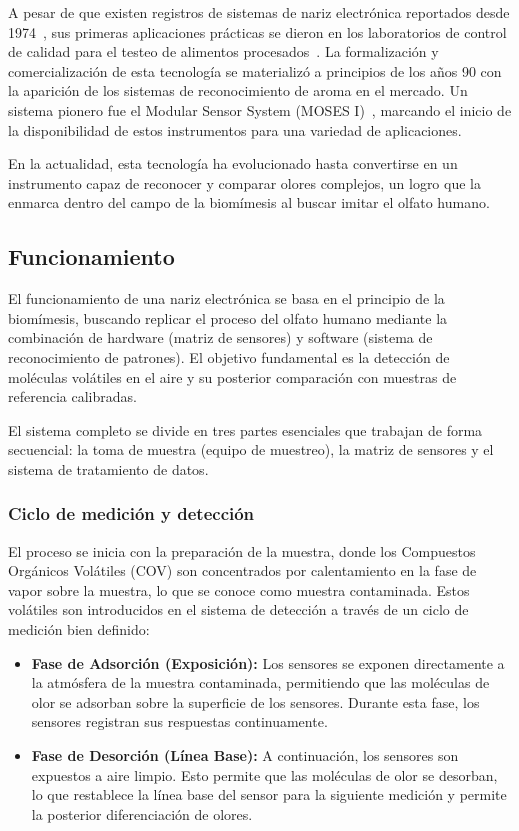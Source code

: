  A pesar de que existen registros de sistemas de nariz electrónica reportados desde 1974~\cite{PersaudDodd1982,GardnerBartlett1994}, sus primeras aplicaciones prácticas se dieron en los laboratorios de control de calidad para el testeo de alimentos procesados~\cite{KarakayaUlucanTurkan2020}. La formalización y comercialización de esta tecnología se materializó a principios de los años 90 con la aparición de los sistemas de reconocimiento de aroma en el mercado. Un sistema pionero fue el Modular Sensor System (MOSES I)~\cite{UlmerMitrovics1997}, marcando el inicio de la disponibilidad de estos instrumentos para una variedad de aplicaciones.
\par

En la actualidad, esta tecnología ha evolucionado hasta convertirse en un instrumento capaz de reconocer y comparar olores complejos, un logro que la enmarca dentro del campo de la biomímesis al buscar imitar el olfato humano.

\subsection{Funcionamiento}
El funcionamiento de una nariz electrónica se basa en el principio de la biomímesis, buscando replicar el proceso del olfato humano mediante la combinación de hardware (matriz de sensores) y software (sistema de reconocimiento de patrones). El objetivo fundamental es la detección de moléculas volátiles en el aire y su posterior comparación con muestras de referencia calibradas.
\par

El sistema completo se divide en tres partes esenciales que trabajan de forma secuencial: la toma de muestra (equipo de muestreo), la matriz de sensores y el sistema de tratamiento de datos.

\subsubsection{Ciclo de medición y detección}
El proceso se inicia con la preparación de la muestra, donde los Compuestos Orgánicos Volátiles (COV) son concentrados por calentamiento en la fase de vapor sobre la muestra, lo que se conoce como muestra contaminada. Estos volátiles son introducidos en el sistema de detección a través de un ciclo de medición bien definido:
\begin{itemize}
    \item \textbf{Fase de Adsorción (Exposición):} Los sensores se exponen directamente a la atmósfera de la muestra contaminada, permitiendo que las moléculas de olor se adsorban sobre la superficie de los sensores. Durante esta fase, los sensores registran sus respuestas continuamente.
    \item \textbf{Fase de Desorción (Línea Base):} A continuación, los sensores son expuestos a aire limpio. Esto permite que las moléculas de olor se desorban, lo que restablece la línea base del sensor para la siguiente medición y permite la posterior diferenciación de olores.
\end{itemize}

